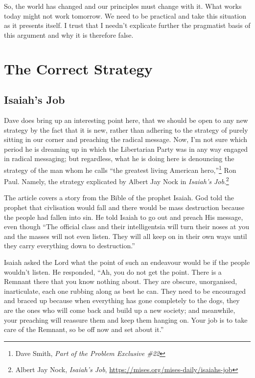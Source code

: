 \documentclass[11pt]{article}
\begin{document}
So, the world has changed and our principles must change with it. What works today might not work tomorrow. We need to be practical and take this situation as it presents itself. I trust that I needn't explicate further the pragmatist basis of this argument and why it is therefore false.
\section{The Correct Strategy}
\label{sec:org85c0613}
\subsection{Isaiah's Job}
\label{sec:org5331b33}
Dave does bring up an interesting point here, that we should be open to any new strategy by the fact that it is new, rather than adhering to the strategy of purely sitting in our corner and preaching the radical message. Now, I'm not sure which period he is dreaming up in which the Libertarian Party was in any way engaged in radical messaging; but regardless, what he is doing here is denouncing the strategy of the man whom he calls ``the greatest living American hero,''\footnote{Dave Smith, \emph{Part of the Problem Exclusive \#22}} Ron Paul. Namely, the strategy explicated by Albert Jay Nock in \emph{Isaiah's Job}.\footnote{Albert Jay Nock, \emph{Isaiah's Job}, \url{https://mises.org/mises-daily/isaiahs-job}}

The article covers a story from the Bible of the prophet Isaiah. God told the prophet that civlisation would fall and there would be mass destruction because the people had fallen into sin. He told Isaiah to go out and preach His message, even though ``The official class and their intelligentsia will turn their noses at you and the masses will not even listen. They will all keep on in their own ways until they carry everything down to destruction.''

Isaiah asked the Lord what the point of such an endeavour would be if the people wouldn't listen. He responded, ``Ah, you do not get the point. There is a Remnant there that you know nothing about. They are obscure, unorganised, inarticulate, each one rubbing along as best he can. They need to be encouraged and braced up because when everything has gone completely to the dogs, they are the ones who will come back and build up a new society; and meanwhile, your preaching will reassure them and keep them hanging on. Your job is to take care of the Remnant, so be off now and set about it.''
\end{document}
